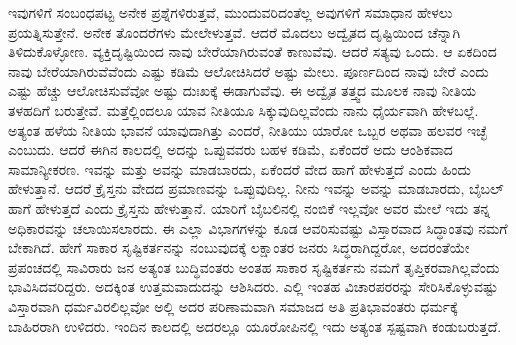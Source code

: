 ಇವುಗಳಿಗೆ ಸಂಬಂಧಪಟ್ಟ ಅನೇಕ ಪ್ರಶ್ನೆಗಳಿರುತ್ತವೆ, ಮುಂದುವರಿದಂತೆಲ್ಲ ಅವುಗಳಿಗೆ ಸಮಾಧಾನ ಹೇಳಲು ಪ್ರಯತ್ನಿಸುತ್ತೇನೆ. ಅನೇಕ ತೊಂದರೆಗಳು ಮೇಲೇಳುತ್ತವೆ. ಆದರೆ ಮೊದಲು ಅದ್ವೈತದ ದೃಷ್ಟಿಯಿಂದ ಚೆನ್ನಾಗಿ ತಿಳಿದುಕೊಳ್ಳೋಣ. ವ್ಯಕ್ತಿದೃಷ್ಟಿಯಿಂದ ನಾವು ಬೇರೆಯಾಗಿರುವಂತೆ ಕಾಣುವೆವು. ಆದರೆ ಸತ್ಯವು ಒಂದು. ಆ ಏಕದಿಂದ ನಾವು ಬೇರೆಯಾಗಿರುವೆವೆಂದು ಎಷ್ಟು ಕಡಿಮೆ ಆಲೋಚಿಸಿದರೆ ಅಷ್ಟು ಮೇಲು. ಪೂರ್ಣದಿಂದ ನಾವು ಬೇರೆ ಎಂದು ಎಷ್ಟು ಹೆಚ್ಚು ಆಲೋಚಿಸುವೆವೋ ಅಷ್ಟು ದುಃಖಕ್ಕೆ ಈಡಾಗುವೆವು. ಈ ಅದ್ವೈತ ತತ್ತ್ವದ ಮೂಲಕ ನಾವು ನೀತಿಯ ತಳಹದಿಗೆ ಬರುತ್ತೇವೆ. ಮತ್ತೆಲ್ಲಿಂದಲೂ ಯಾವ ನೀತಿಯೂ ಸಿಕ್ಕುವುದಿಲ್ಲವೆಂದು ನಾನು ಧೈರ್ಯವಾಗಿ ಹೇಳಬಲ್ಲೆ. ಅತ್ಯಂತ ಹಳೆಯ ನೀತಿಯ ಭಾವನೆ ಯಾವುದಾಗಿತ್ತು ಎಂದರೆ, ನೀತಿಯು ಯಾರೋ ಒಬ್ಬರ ಅಥವಾ ಹಲವರ ಇಚ್ಛೆ ಎಂಬುದು. ಆದರೆ ಈಗಿನ ಕಾಲದಲ್ಲಿ ಅದನ್ನು ಒಪ್ಪುವವರು ಬಹಳ ಕಡಿಮೆ, ಏಕೆಂದರೆ ಅದು ಆಂಶಿಕವಾದ ಸಾಮಾನ್ಯೀಕರಣ. ಇವನ್ನು ಮತ್ತು ಅವನ್ನು ಮಾಡಬಾರದು, ಏಕೆಂದರೆ ವೇದ ಹಾಗೆ ಹೇಳುತ್ತದೆ ಎಂದು ಹಿಂದು ಹೇಳುತ್ತಾನೆ. ಆದರೆ ಕ್ರೈಸ್ತನು ವೇದದ ಪ್ರಮಾಣವನ್ನು ಒಪ್ಪುವುದಿಲ್ಲ. ನೀನು ಇವನ್ನು ಅವನ್ನು ಮಾಡಬಾರದು, ಬೈಬಲ್​ ಹಾಗೆ ಹೇಳುತ್ತದೆ ಎಂದು ಕ್ರೈಸ್ತನು ಹೇಳುತ್ತಾನೆ. ಯಾರಿಗೆ ಬೈಬಲಿನಲ್ಲಿ ನಂಬಿಕೆ ಇಲ್ಲವೋ ಅವರ ಮೇಲೆ ಇದು ತನ್ನ ಅಧಿಕಾರವನ್ನು ಚಲಾಯಿಸಲಾರದು. ಈ ಎಲ್ಲಾ ವಿಭಾಗಗಳನ್ನು ಕೂಡ ಆವರಿಸುವಷ್ಟು ವಿಸ್ತಾರವಾದ ಸಿದ್ಧಾಂತವು ನಮಗೆ ಬೇಕಾಗಿದೆ. ಹೇಗೆ ಸಾಕಾರ ಸೃಷ್ಟಿಕರ್ತನನ್ನು ನಂಬುವುದಕ್ಕೆ ಲಕ್ಷಾಂತರ ಜನರು ಸಿದ್ಧರಾಗಿದ್ದರೋ, ಅದರಂತೆಯೇ ಪ್ರಪಂಚದಲ್ಲಿ ಸಾವಿರಾರು ಜನ ಅತ್ಯಂತ ಬುದ್ಧಿವಂತರು ಅಂತಹ ಸಾಕಾರ ಸೃಷ್ಟಿಕರ್ತನು ನಮಗೆ ತೃಪ್ತಿಕರವಾಗಿಲ್ಲವೆಂದು ಭಾವಿಸಿದವರಿದ್ದರು. ಅದಕ್ಕಿಂತ ಉತ್ತಮವಾದುದನ್ನು ಆಶಿಸಿದರು. ಎಲ್ಲಿ ಇಂತಹ ವಿಚಾರಪರರನ್ನು ಸೇರಿಸಿಕೊಳ್ಳುವಷ್ಟು ವಿಸ್ತಾರವಾಗಿ ಧರ್ಮವಿರಲಿಲ್ಲವೋ ಅಲ್ಲಿ ಅದರ ಪರಿಣಾಮವಾಗಿ ಸಮಾಜದ ಅತಿ ಪ್ರತಿಭಾವಂತರು ಧರ್ಮಕ್ಕೆ ಬಾಹಿರರಾಗಿ ಉಳಿದರು. ಇಂದಿನ ಕಾಲದಲ್ಲಿ ಅದರಲ್ಲೂ ಯೂರೋಪಿನಲ್ಲಿ ಇದು ಅತ್ಯಂತ ಸ್ಪಷ್ಟವಾಗಿ ಕಂಡುಬರುತ್ತದೆ. 

\vskip 0.2cm

